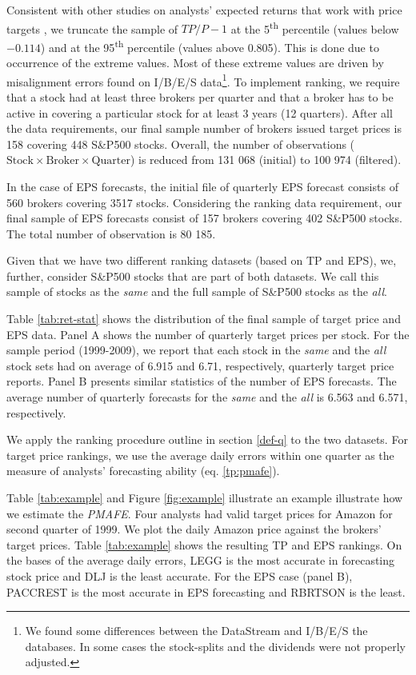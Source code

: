 \documentclass{article}\usepackage[]{graphicx}\usepackage[]{color}
\newcommand{\same}{\textit{same}}
\newcommand{\all}{\textit{all}}
\begin{document}
Consistent with other studies on analysts' expected returns that work with price targets  \citep{bradshaw2002,brav2003,da2011}, we truncate the sample of $TP/P-1$ at the 5\textsuperscript{th} percentile (values below \ensuremath{-0.114}) and at the 95\textsuperscript{th} percentile (values above 0.805). This is done due to occurrence of the extreme values. Most of these extreme values are driven by misalignment errors found on I/B/E/S data\footnote{We found some differences between the  DataStream and I/B/E/S the databases. In some cases the stock-splits and the dividends were not properly adjusted.}. To implement ranking, we require that a stock had at least three brokers per quarter and that a broker has to be active in covering a particular stock for at least 3 years (12 quarters). After all the  data requirements, our final sample number of brokers issued target prices is 158 covering 448 S\&P500 stocks. Overall, the number of observations ($\mathrm{Stock} \times \mathrm{Broker} \times  \mathrm{Quarter}$) is reduced  from 131 068 (initial) to 100 974 (filtered).

In the case of EPS forecasts, the initial file of quarterly EPS forecast consists of 560 brokers covering 3517 stocks. Considering the ranking data requirement, our final sample of EPS forecasts consist of  157 brokers covering 402 S\&P500 stocks. The total number of observation is 80 185.


Given that we have two different ranking datasets (based on TP and EPS), we, further, consider S\&P500 stocks that are part of both datasets. We call this sample of stocks as the \same{} and the full sample of S\&P500 stocks as the \all{}. 

Table \ref{tab:ret-stat} shows the distribution of the final sample of target price and EPS data. Panel A shows the number of quarterly target prices per stock. For the sample period (1999-2009), we report that each stock in the \same{} and the \all{} stock sets had on average of 6.915 and 6.71, respectively, quarterly target price reports. Panel B  presents similar statistics of the number of EPS forecasts. The average number of quarterly forecasts for the  \same{} and the \all{} is 6.563 and 6.571, respectively.

We apply the ranking procedure outline in section \ref{def-q} to the two datasets. For target price rankings, we use the average daily errors within one quarter as the measure of analysts' forecasting ability (eq. \ref{tp:pmafe}). 

Table \ref{tab:example} and Figure \ref{fig:example} illustrate an example illustrate how we estimate the \textit{PMAFE}. Four analysts had valid target prices for Amazon for second quarter of 1999. We plot the daily Amazon price against the brokers' target prices. Table \ref{tab:example} shows the resulting TP and EPS rankings. On the bases of the average daily errors, LEGG is the most accurate in forecasting stock price and  DLJ is the least accurate. For the EPS case (panel B), PACCREST is the most accurate in EPS forecasting and RBRTSON is the least. 
\end{document}
